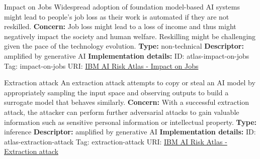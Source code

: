 \begin{definitionbox}{Impact on Jobs}
Widespread adoption of foundation model-based AI systems might lead to people's job loss as their work is automated if they are not reskilled.\newline\newline
\textbf{Concern: }Job loss might lead to a loss of income and thus might negatively impact the society and human welfare. Reskilling might be challenging given the pace of the technology evolution.\newline\newline
\textbf{Type: }non-technical\newline
\textbf{Descriptor: }amplified by generative AI \newline\newline
\textbf{Implementation details: } \newline
ID: atlas-impact-on-jobs \newline
Tag: impact-on-jobs \newline
URI:  \href{https://www.ibm.com/docs/en/watsonx/saas?topic=SSYOK8/wsj/ai-risk-atlas/impact-on-jobs.html}{IBM AI Risk Atlas - Impact on Jobs}\newline
\end{definitionbox}
\begin{definitionbox}{Extraction attack}
An extraction attack attempts to copy or steal an AI model by appropriately sampling the input space and observing outputs to build a surrogate model that behaves similarly.\newline\newline
\textbf{Concern: }With a successful extraction attack, the attacker can perform further adversarial attacks to gain valuable information such as sensitive personal information or intellectual property.\newline\newline
\textbf{Type: }inference\newline
\textbf{Descriptor: }amplified by generative AI \newline\newline
\textbf{Implementation details: } \newline
ID: atlas-extraction-attack \newline
Tag: extraction-attack \newline
URI:  \href{https://www.ibm.com/docs/en/watsonx/saas?topic=SSYOK8/wsj/ai-risk-atlas/extraction-attack.html}{IBM AI Risk Atlas - Extraction attack}\newline
\end{definitionbox}
